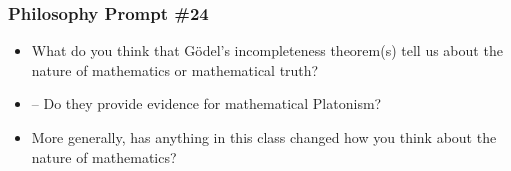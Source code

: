 \fi 

\begin{frame}
\frametitle{Philosophy Prompt \#24}

\begin{itemize}[<+->]

\item What do you think that G\"odel's incompleteness theorem(s) tell us about the nature of mathematics or mathematical truth?

\item[] -- Do they provide evidence for mathematical Platonism?

\item More generally, has anything in this class changed how you think about the nature of mathematics?

\end{itemize}
\end{frame}


